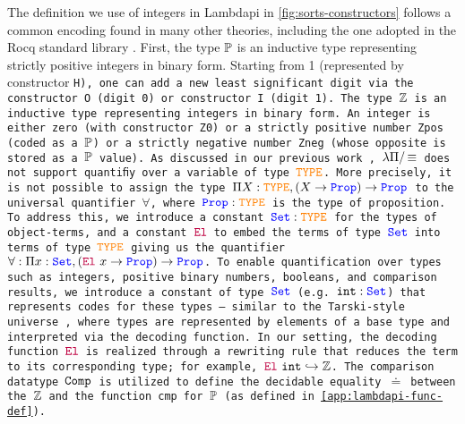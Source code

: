 The definition we use of integers in Lambdapi in \cref{fig:sorts-constructors} follows a common encoding found in many other theories, including the one adopted in the Rocq standard library \cite{Rocq-refman}.
First, the type $\bb{P}$  is an inductive type representing strictly positive integers in binary form.
Starting from 1 (represented by constructor \tt{H}), one can add a new least significant digit via the constructor \tt{O} (digit 0) or constructor \tt{I} (digit 1). 
The type $\bb{Z}$ is an inductive type representing integers in binary form.
An integer is either zero (with constructor \tt{Z0}) or a strictly positive number \tt{Zpos} (coded as a $\bb{P}$) or a strictly negative number \tt{Zneg} (whose opposite is stored as a $\bb{P}$ value).
%
As discussed in our previous work \cite{ColtellacciMD24}, $\lpm$ does not support quantiﬁy over a variable of type $\type$. More precisely, it is not possible to assign the type $\Pi X : \type,(X \ra \prop) \ra \prop$ to the universal quantifier $\forall$, where $\prop: \type$ is the type of proposition.
To address this, we introduce a constant $\set : \type$ for the types of object-terms, and a constant ${\el}$ to embed the terms of type $\set$ into terms of type $\type$ giving us the quantifier $\forall: \Pi x: \set, (\el~x \ra \prop) \ra \prop$.
%
To enable quantification over types such as integers, positive binary numbers, booleans, and comparison results, we introduce a constant of type $\set$ (e.g. $\tt{int}: \set$) that represents codes for these types — similar to the Tarski-style universe \cite[\S Universes]{intuitype},
where types are represented by elements of a base type and interpreted via the decoding function. In our setting, the decoding function $\el$  is realized through a rewriting rule that reduces the term to its corresponding type; for example, $\el~\tt{int} \re \bb{Z}$.
The comparison datatype $\tt{Comp}$ is utilized to define the decidable equality $\doteq$ between the $\bb{Z}$ and the function \tt{cmp} for $\bb{P}$ (as defined in \cref{app:lambdapi-func-def}).

